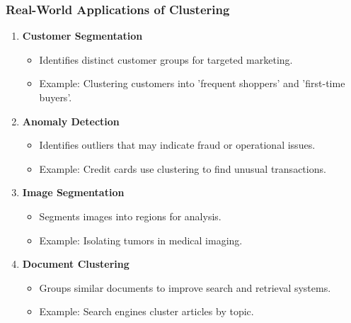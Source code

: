 \documentclass[aspectratio=169]{beamer}
\begin{document}
\begin{frame}[fragile]
    \frametitle{Real-World Applications of Clustering}
    \begin{enumerate}
        \item \textbf{Customer Segmentation}
        \begin{itemize}
            \item Identifies distinct customer groups for targeted marketing.
            \item Example: Clustering customers into 'frequent shoppers' and 'first-time buyers'.
        \end{itemize}
        
        \item \textbf{Anomaly Detection}
        \begin{itemize}
            \item Identifies outliers that may indicate fraud or operational issues.
            \item Example: Credit cards use clustering to find unusual transactions.
        \end{itemize}
        
        \item \textbf{Image Segmentation}
        \begin{itemize}
            \item Segments images into regions for analysis.
            \item Example: Isolating tumors in medical imaging.
        \end{itemize}
        
        \item \textbf{Document Clustering}
        \begin{itemize}
            \item Groups similar documents to improve search and retrieval systems.
            \item Example: Search engines cluster articles by topic.
        \end{itemize}
    \end{enumerate}
\end{frame}
\end{document}
